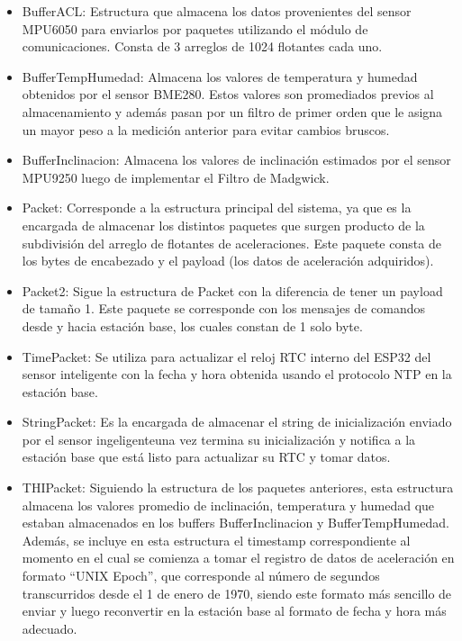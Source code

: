 \begin{itemize}
    \item BufferACL: Estructura que almacena los datos provenientes del sensor MPU6050 para enviarlos por paquetes utilizando el módulo de comunicaciones. Consta de 3 arreglos de 1024 flotantes cada uno.
    \item BufferTempHumedad: Almacena los valores de temperatura y humedad obtenidos por el sensor BME280. Estos valores son promediados previos al almacenamiento y además pasan por un filtro de primer orden que le asigna un mayor peso a la medición anterior para evitar cambios bruscos.
    \item BufferInclinacion: Almacena los valores de inclinación estimados por el sensor MPU9250 luego de implementar el Filtro de Madgwick.
    \item Packet: Corresponde a la estructura principal del sistema, ya que es la encargada de almacenar los distintos paquetes que surgen producto de la subdivisión del arreglo de flotantes de aceleraciones. Este paquete consta de los bytes de encabezado y el payload (los datos de aceleración adquiridos).
    \item Packet2: Sigue la estructura de Packet con la diferencia de tener un payload de tamaño 1. Este paquete se corresponde con los mensajes de comandos desde y hacia estación base, los cuales constan de 1 solo byte.
    \item TimePacket: Se utiliza para actualizar el reloj RTC interno del ESP32 del sensor inteligente con la fecha y hora obtenida usando el protocolo NTP en la estación base.
    \item StringPacket: Es la encargada de almacenar el string de inicialización enviado por el sensor ingeligenteuna vez termina su inicialización y notifica a la estación base que está listo para actualizar su RTC y tomar datos.
    \item THIPacket: Siguiendo la estructura de los paquetes anteriores, esta estructura almacena los valores promedio de inclinación, temperatura y humedad que estaban almacenados en los buffers BufferInclinacion y BufferTempHumedad. Además, se incluye en esta estructura el timestamp correspondiente al momento en el cual se comienza a tomar el registro de datos de aceleración en formato ``UNIX Epoch'', que corresponde al número de segundos transcurridos desde el 1 de enero de 1970, siendo este formato más sencillo de enviar y luego reconvertir en la estación base al formato de fecha y hora más adecuado.
\end{itemize}


